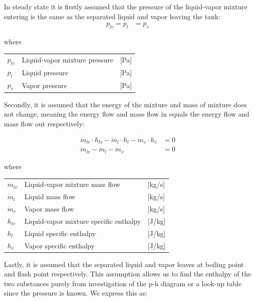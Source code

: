 In steady state it is firstly assumed that the pressure of the liquid-vapor mixture entering is the same as the separated liquid and vapor leaving the tank:
\begin{align}
	p_{lv} 	= p_{l}					&  = p_{v}
	\label{eq:Flash_tank_pressure}
\end{align}

where

\begin{center}
	\begin{tabular}{l p{8cm} l}
		$p_{lv}$				&  Liquid-vapor mixture pressure		& [\si{Pa}]\\
		$p_{l}$					&  Liquid pressure 						& [\si{Pa}] \\
		$p_{v}$					&  Vapor pressure						& [\si{Pa}]\\
	\end{tabular}
\end{center}


Secondly, it is assumed that the energy of the mixture and mass of mixture does not change, meaning the energy flow and mass flow in equals the energy flow and mass flow out respectively:

\begin{align}
	\dot{m}_{lv} \cdot  h_{lv}  - \dot{m}_{l} \cdot  h_{l} - \dot{m}_{v} \cdot  h_{v} & = 0 \label{eq:Flash_tank_energyflow} \\
	\dot{m}_{lv} - \dot{m}_{l} - \dot{m}_{v} & = 0  \label{eq:Flash_tank_massflow}
\end{align}

where

\begin{center}
	\begin{tabular}{l p{8cm} l}
		$\dot{m}_{lv}$			&  Liquid-vapor mixture mass flow			& [\si{kg}/\si{s}]\\
		$\dot{m}_{l}$			&  Liquid mass flow 						& [\si{kg}/\si{s}] \\
		$\dot{m}_{v}$			&  Vapor mass flow							& [\si{kg}/\si{s}]\\
		$h_{lv}$				&  Liquid-vapor mixture specific enthalpy	& [\si{J}/\si{kg}]\\
		$h_{l}$					&  Liquid specific enthalpy 				& [\si{J}/\si{kg}] \\
		$h_{v}$					&  Vapor specific enthalpy					& [\si{J}/\si{kg}]\\
	\end{tabular}
\end{center}

Lastly, it is assumed that the separated liquid and vapor leaves at boiling point and flash point respectively. This assumption allows us to find the enthalpy of the two substances purely from investigation of the p-h diagram or a look-up table since the pressure is known. We express this as:


